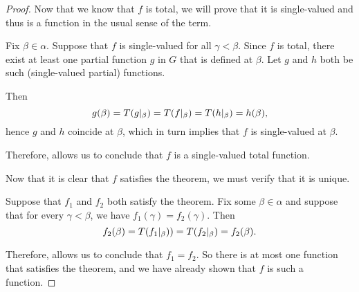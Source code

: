 \begin{proof}
   Now that we know that \( f \) is total, we will prove that it is single-valued and thus is a function in the usual sense of the term.

  Fix \( \beta \in \alpha \). Suppose that \( f \) is single-valued for all \( \gamma < \beta \). Since \( f \) is total, there exist at least one partial function \( g \) in \( G \) that is defined at \( \beta \). Let \( g \) and \( h \) both be such (single-valued partial) functions.

  Then
  \begin{equation*}
    g(\beta) = T(g\vert_\beta) = T(f\vert_\beta) = T(h\vert_\beta) = h(\beta),
  \end{equation*}
  hence \( g \) and \( h \) coincide at \( \beta \), which in turn implies that \( f \) is single-valued at \( \beta \).

  Therefore,  allows us to conclude that \( f \) is a single-valued total function.

   Now that it is clear that \( f \) satisfies the theorem, we must verify that it is unique.

  Suppose that \( f_1 \) and \( f_2 \) both satisfy the theorem. Fix some \( \beta \in \alpha \) and suppose that for every \( \gamma < \beta \), we have \( f_1(\gamma) = f_2(\gamma) \). Then
  \begin{equation*}
    f_2(\beta) = T(f_1\vert_\beta)) = T(f_2\vert_\beta) = f_2(\beta).
  \end{equation*}

  Therefore,  allows us to conclude that \( f_1 = f_2 \). So there is at most one function that satisfies the theorem, and we have already shown that \( f \) is such a function.
\end{proof}

